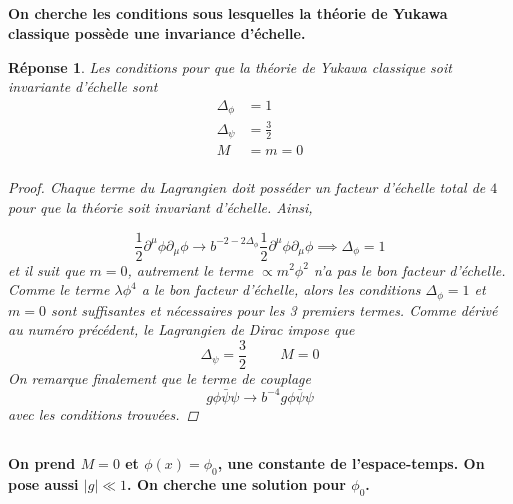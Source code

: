 \documentclass{article}
\numberwithin{equation}{section}
\theoremstyle{solution}
\newtheorem{solution}{Réponse}[section]
\begin{document}
\subsection{}
\textbf{On cherche les conditions sous lesquelles la théorie de Yukawa classique possède une invariance d'échelle.}
\begin{solution}
Les conditions pour que la théorie de Yukawa classique soit invariante d'échelle sont
\begin{equation}
        \boxed{
        \begin{split}
        \Delta_{\phi} &= 1 \\
        \Delta_{\psi} &=  \frac{3}{2} \\
        M &= m = 0 \\
        \end{split}
}
\end{equation} 
\begin{proof}
Chaque terme du Lagrangien doit posséder un facteur d'échelle total de $4$ pour que la théorie soit invariant d'échelle. 
Ainsi,

\begin{equation}
        \frac{1}{2}\partial^{\mu}\phi \partial_\mu \phi \rightarrow b^{-2-2\Delta_{\phi}}  \frac{1}{2}\partial^{\mu}\phi \partial_\mu \phi \implies \Delta_{\phi} = 1 
\end{equation} 
et il suit que $m = 0$, autrement le terme $\propto m^{2} \phi^2$ n'a pas le bon facteur d'échelle. Comme 
le terme $\lambda \phi^{4}$ a le bon facteur d'échelle, alors les conditions $\Delta_{\phi} = 1$ et $m = 0$ sont suffisantes 
et nécessaires pour les 3 premiers termes. Comme dérivé au numéro précédent, le Lagrangien de Dirac impose que
\begin{equation}
        \Delta_{\psi} = \frac{3}{2}\hspace{1cm} M = 0
\end{equation} 
On remarque finalement que le terme de couplage
\begin{equation}
        g \phi \bar{\psi} \psi \rightarrow b^{-4} g\phi \bar{\psi}\psi
\end{equation} 
avec les conditions trouvées. 
\end{proof}
        
\end{solution}

\subsection{}
\textbf{On prend $M = 0$ et $\phi(x) = \phi_0$, une constante de l'espace-temps. On pose aussi $|g| \ll 1$. On cherche une solution pour $\phi_0$.}
        
\end{document}
